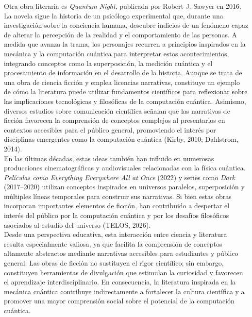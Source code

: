 \documentclass[12pt,a4paper]{article}
\begin{document}
Otra obra literaria es \textit{Quantum Night}, publicada por Robert J. Sawyer en 2016. La novela sigue la historia de un psicólogo experimental que, durante una investigación sobre la conciencia humana, descubre indicios de un fenómeno capaz de alterar la percepción de la realidad y el comportamiento de las personas. A medida que avanza la trama, los personajes recurren a principios inspirados en la mecánica y la computación cuántica para interpretar estos acontecimientos, integrando conceptos como la superposición, la medición cuántica y el procesamiento de información en el desarrollo de la historia. Aunque se trata de una obra de ciencia ficción y emplea licencias narrativas, constituye un ejemplo de cómo la literatura puede utilizar fundamentos científicos para reflexionar sobre las implicaciones tecnológicas y filosóficas de la computación cuántica. Asimismo, diversos estudios sobre comunicación científica señalan que las narrativas de ficción favorecen la comprensión de conceptos complejos al presentarlos en contextos accesibles para el público general, promoviendo el interés por disciplinas emergentes como la computación cuántica (Kirby, 2010; Dahlstrom, 2014).\\ 

En las últimas décadas, estas ideas también han influido en numerosas producciones cinematográficas y audiovisuales relacionadas con la física cuántica. \textit{Películas como Everything Everywhere All at Once} (2022) y series como \textit{Dark} (2017–2020) utilizan conceptos inspirados en universos paralelos, superposición y múltiples líneas temporales para construir sus narrativas. Si bien estas obras incorporan importantes elementos de ficción, han contribuido a despertar el interés del público por la computación cuántica y por los desafíos filosóficos asociados al estudio del universo (TELOS, 2026).\\

Desde una perspectiva educativa, esta interacción entre ciencia y literatura resulta especialmente valiosa, ya que facilita la comprensión de conceptos altamente abstractos mediante narrativas accesibles para estudiantes y público general. Las obras de ficción no sustituyen el rigor científico; sin embargo, constituyen herramientas de divulgación que estimulan la curiosidad y favorecen el aprendizaje interdisciplinario. En consecuencia, la literatura inspirada en la mecánica cuántica contribuye indirectamente a fortalecer la cultura científica y a promover una mayor comprensión social sobre el potencial de la computación cuántica.\\
\end{document}

